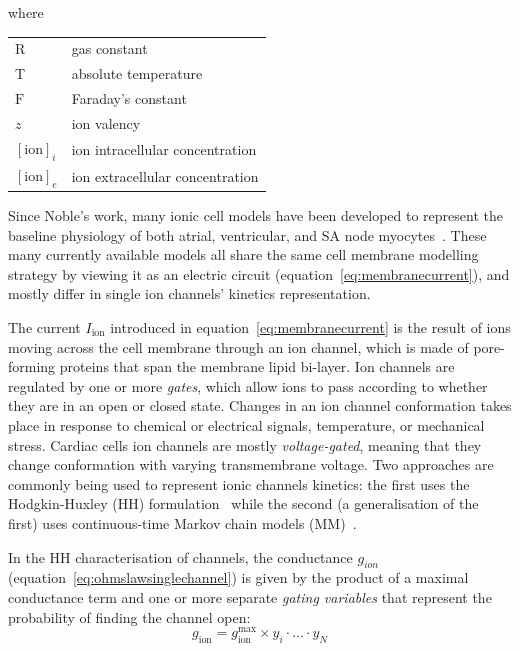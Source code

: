 \noindent
where

\vspace{0.2cm}
\begin{tabular}{ll}
    $\textrm{R}$  & gas constant \\
    $\textrm{T}$  & absolute temperature \\
    $\textrm{F}$  & Faraday's constant \\
    $z$           & ion valency \\
    $[\textrm{ion}]_{i}$  & ion intracellular concentration \\
    $[\textrm{ion}]_{e}$  & ion extracellular concentration \\
\end{tabular}

\vspace{0.2cm}
Since Noble's work, many ionic cell models have been developed to represent the baseline physiology of both atrial, ventricular, and SA node myocytes~\cite{Corrado:2020}. These many currently available models all share the same cell membrane modelling strategy by viewing it as an electric circuit (equation~\eqref{eq:membranecurrent}), and mostly differ in single ion channels' kinetics representation.

\vspace{0.2cm}\noindent
The current $I_{\textrm{ion}}$ introduced in equation~\eqref{eq:membranecurrent} is the result of ions moving across the cell membrane through an ion channel, which is made of pore-forming proteins that span the membrane lipid bi-layer. Ion channels are regulated by one or more \textit{gates}, which allow ions to pass according to whether they are in an open or closed state. Changes in an ion channel conformation takes place in response to chemical or electrical signals, temperature, or mechanical stress. Cardiac cells ion channels are mostly \textit{voltage-gated}, meaning that they change conformation with varying transmembrane voltage. Two approaches are commonly being used to represent ionic channels kinetics: the first uses the Hodgkin-Huxley (\acs{HH}) formulation~\cite{Hodgkin:1952} while the second (a generalisation of the first) uses continuous-time Markov chain models (\acs{MM})~\cite{Fink:2009}.

\vspace{0.2cm}
In the HH characterisation of channels, the conductance $g_{ion}$ (equation~\eqref{eq:ohmslawsinglechannel}) is given by the product of a maximal conductance term and one or more separate \textit{gating variables} that represent the probability of finding the channel open:
%
\begin{equation}
    g_{\textrm{ion}} = g_{\textrm{ion}}^{\textrm{max}}\times y_i\cdot\dots\cdot y_N
\end{equation}

